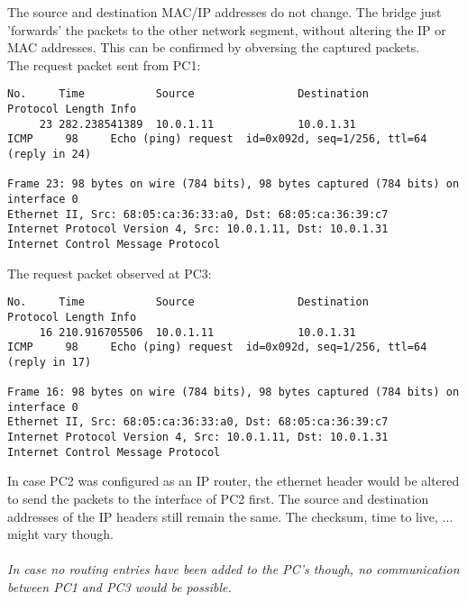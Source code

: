 The source and destination MAC/IP addresses do not change. The bridge just 'forwards' the packets to the other network segment, without altering the IP or MAC addresses. This can be confirmed by obversing the captured packets. \\

The request packet sent from PC1: \\
\begin{lstlisting}
No.     Time           Source                Destination           Protocol Length Info
     23 282.238541389  10.0.1.11             10.0.1.31             ICMP     98     Echo (ping) request  id=0x092d, seq=1/256, ttl=64 (reply in 24)

Frame 23: 98 bytes on wire (784 bits), 98 bytes captured (784 bits) on interface 0
Ethernet II, Src: 68:05:ca:36:33:a0, Dst: 68:05:ca:36:39:c7
Internet Protocol Version 4, Src: 10.0.1.11, Dst: 10.0.1.31
Internet Control Message Protocol
\end{lstlisting}

The request packet observed at PC3: \\
\begin{lstlisting}
No.     Time           Source                Destination           Protocol Length Info
     16 210.916705506  10.0.1.11             10.0.1.31             ICMP     98     Echo (ping) request  id=0x092d, seq=1/256, ttl=64 (reply in 17)

Frame 16: 98 bytes on wire (784 bits), 98 bytes captured (784 bits) on interface 0
Ethernet II, Src: 68:05:ca:36:33:a0, Dst: 68:05:ca:36:39:c7
Internet Protocol Version 4, Src: 10.0.1.11, Dst: 10.0.1.31
Internet Control Message Protocol
\end{lstlisting}


In case PC2 was configured as an IP router, the ethernet header would be altered to send the packets to the interface of PC2 first. The source and destination addresses of the IP headers still remain the same. The checksum, time to live, ... might vary though. \\ \\
\textit{In case no routing entries have been added to the PC's though, no communication between PC1 and PC3 would be possible.}
